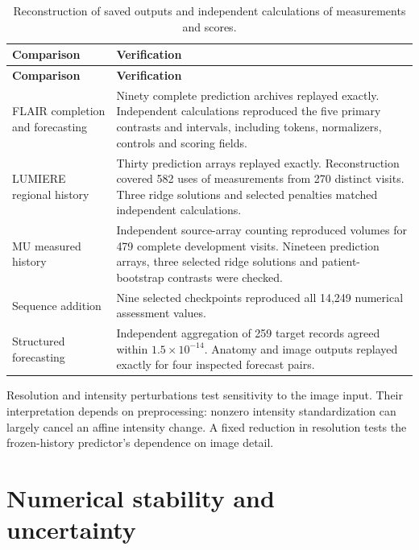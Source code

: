 \begingroup\singlespacing\small\setlength{\tabcolsep}{4pt}\renewcommand{\arraystretch}{1.25}
\begin{longtable}{>{\raggedright\arraybackslash}p{}>{\raggedright\arraybackslash}p{}}
\caption[Prediction and measurement reproducibility]{Reconstruction of saved outputs and independent calculations of measurements and scores.}\label{tab:6.2}\\
\toprule \textbf{Comparison} & \textbf{Verification} \\\midrule\endfirsthead
\toprule \textbf{Comparison} & \textbf{Verification} \\\midrule\endhead
\bottomrule\endfoot
FLAIR completion and forecasting & Ninety complete prediction archives replayed exactly. Independent calculations reproduced the five primary contrasts and intervals, including tokens, normalizers, controls and scoring fields. \\
LUMIERE regional history & Thirty prediction arrays replayed exactly. Reconstruction covered 582 uses of measurements from 270 distinct visits. Three ridge solutions and selected penalties matched independent calculations. \\
MU measured history & Independent source-array counting reproduced volumes for 479 complete development visits. Nineteen prediction arrays, three selected ridge solutions and patient-bootstrap contrasts were checked. \\
Sequence addition & Nine selected checkpoints reproduced all 14,249 numerical assessment values. \\
Structured forecasting & Independent aggregation of 259 target records agreed within $1.5\times10^{-14}$. Anatomy and image outputs replayed exactly for four inspected forecast pairs. \\
\end{longtable}\endgroup

Resolution and intensity perturbations test sensitivity to the image input. Their interpretation depends on preprocessing: nonzero intensity standardization can largely cancel an affine intensity change. A fixed reduction in resolution tests the frozen-history predictor's dependence on image detail.

\section{Numerical stability and uncertainty}

